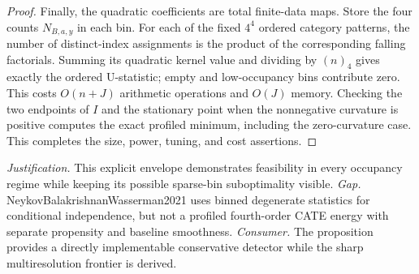 \documentclass{article}
\begin{document}
\begin{proof}
Finally, the quadratic coefficients are total finite-data maps. Store the four counts \(N_{B,a,y}\) in each bin. For each of the fixed \(4^4\) ordered category patterns, the number of distinct-index assignments is the product of the corresponding falling factorials. Summing its quadratic kernel value and dividing by \((n)_4\) gives exactly the ordered U-statistic; empty and low-occupancy bins contribute zero. This costs \(O(n+J)\) arithmetic operations and \(O(J)\) memory. Checking the two endpoints of \(I\) and the stationary point when the nonnegative curvature is positive computes the exact profiled minimum, including the zero-curvature case. This completes the size, power, tuning, and cost assertions.
\end{proof}
\par\smallskip\noindent \textit{Justification.} This explicit envelope demonstrates feasibility in every occupancy regime while keeping its possible sparse-bin suboptimality visible. \textit{Gap.} NeykovBalakrishnanWasserman2021 uses binned degenerate statistics for conditional independence, but not a profiled fourth-order CATE energy with separate propensity and baseline smoothness. \textit{Consumer.} The proposition provides a directly implementable conservative detector while the sharp multiresolution frontier is derived.
\end{document}
